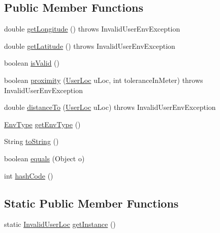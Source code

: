 \subsection*{\-Public \-Member \-Functions}
\begin{DoxyCompactItemize}
\item 
double \hyperlink{classlab_1_1davidahn_1_1appshuttle_1_1collect_1_1env_1_1_invalid_user_loc_a36c7d86dda00353d77ba9e3a74ada2e1}{get\-Longitude} ()  throws Invalid\-User\-Env\-Exception 
\item 
double \hyperlink{classlab_1_1davidahn_1_1appshuttle_1_1collect_1_1env_1_1_invalid_user_loc_a2a51bdfc2ff393cbaf7a34ff54e59ad7}{get\-Latitude} ()  throws Invalid\-User\-Env\-Exception 
\item 
boolean \hyperlink{classlab_1_1davidahn_1_1appshuttle_1_1collect_1_1env_1_1_invalid_user_loc_a5c659854a8395ab91ecc979174a00dd2}{is\-Valid} ()
\item 
boolean \hyperlink{classlab_1_1davidahn_1_1appshuttle_1_1collect_1_1env_1_1_invalid_user_loc_afaa63764b54ae434b7a373aae62c924d}{proximity} (\hyperlink{classlab_1_1davidahn_1_1appshuttle_1_1collect_1_1env_1_1_user_loc}{\-User\-Loc} u\-Loc, int tolerance\-In\-Meter)  throws Invalid\-User\-Env\-Exception 
\item 
double \hyperlink{classlab_1_1davidahn_1_1appshuttle_1_1collect_1_1env_1_1_invalid_user_loc_a175695f336a2bfcc2e924c13bd1c9189}{distance\-To} (\hyperlink{classlab_1_1davidahn_1_1appshuttle_1_1collect_1_1env_1_1_user_loc}{\-User\-Loc} u\-Loc)  throws Invalid\-User\-Env\-Exception 
\item 
\hyperlink{enumlab_1_1davidahn_1_1appshuttle_1_1collect_1_1env_1_1_env_type}{\-Env\-Type} \hyperlink{classlab_1_1davidahn_1_1appshuttle_1_1collect_1_1env_1_1_invalid_user_loc_a866eb2d354079de7bad0032b70814d04}{get\-Env\-Type} ()
\item 
\-String \hyperlink{classlab_1_1davidahn_1_1appshuttle_1_1collect_1_1env_1_1_invalid_user_loc_a414034f6dd12db4193675a9c742c7de3}{to\-String} ()
\item 
boolean \hyperlink{classlab_1_1davidahn_1_1appshuttle_1_1collect_1_1env_1_1_invalid_user_loc_ad949ce6999acdd7259c796cbe56df81b}{equals} (\-Object o)
\item 
int \hyperlink{classlab_1_1davidahn_1_1appshuttle_1_1collect_1_1env_1_1_invalid_user_loc_a8cda459fb672d2510d757d8391c28446}{hash\-Code} ()
\end{DoxyCompactItemize}
\subsection*{\-Static \-Public \-Member \-Functions}
\begin{DoxyCompactItemize}
\item 
static \hyperlink{classlab_1_1davidahn_1_1appshuttle_1_1collect_1_1env_1_1_invalid_user_loc}{\-Invalid\-User\-Loc} \hyperlink{classlab_1_1davidahn_1_1appshuttle_1_1collect_1_1env_1_1_invalid_user_loc_ab44d4dc0533e7ad4c4aa7d73f571fbf8}{get\-Instance} ()
\end{DoxyCompactItemize}


